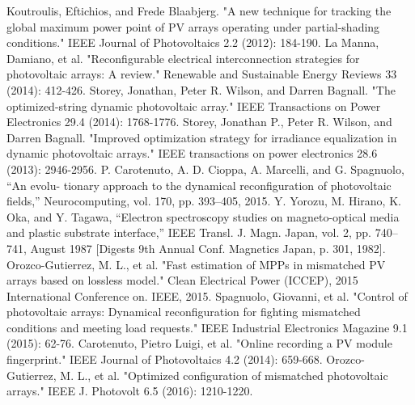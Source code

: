 \documentclass[conference]{IEEEtran}
\begin{document}
\begin{thebibliography}{00}
 Koutroulis, Eftichios, and Frede Blaabjerg. "A new technique for tracking the global maximum power point of PV arrays operating under partial-shading conditions." IEEE Journal of Photovoltaics 2.2 (2012): 184-190.
 La Manna, Damiano, et al. "Reconfigurable electrical interconnection strategies for photovoltaic arrays: A review." Renewable and Sustainable Energy Reviews 33 (2014): 412-426.
Storey, Jonathan, Peter R. Wilson, and Darren Bagnall. "The optimized-string dynamic photovoltaic array." IEEE Transactions on Power Electronics 29.4 (2014): 1768-1776.
 Storey, Jonathan P., Peter R. Wilson, and Darren Bagnall. "Improved optimization strategy for irradiance equalization in dynamic photovoltaic arrays." IEEE transactions on power electronics 28.6 (2013): 2946-2956.
 P. Carotenuto, A. D. Cioppa, A. Marcelli, and G. Spagnuolo, “An evolu- tionary approach to the dynamical reconfiguration of photovoltaic fields,” Neurocomputing, vol. 170, pp. 393–405, 2015.
 Y. Yorozu, M. Hirano, K. Oka, and Y. Tagawa, ``Electron spectroscopy studies on magneto-optical media and plastic substrate interface,'' IEEE Transl. J. Magn. Japan, vol. 2, pp. 740--741, August 1987 [Digests 9th Annual Conf. Magnetics Japan, p. 301, 1982].
 Orozco-Gutierrez, M. L., et al. "Fast estimation of MPPs in mismatched PV arrays based on lossless model." Clean Electrical Power (ICCEP), 2015 International Conference on. IEEE, 2015.
 Spagnuolo, Giovanni, et al. "Control of photovoltaic arrays: Dynamical reconfiguration for fighting mismatched conditions and meeting load requests." IEEE Industrial Electronics Magazine 9.1 (2015): 62-76.
 Carotenuto, Pietro Luigi, et al. "Online recording a PV module fingerprint." IEEE Journal of Photovoltaics 4.2 (2014): 659-668.
 Orozco-Gutierrez, M. L., et al. "Optimized configuration of mismatched photovoltaic arrays." IEEE J. Photovolt 6.5 (2016): 1210-1220.
  
\end{thebibliography}
\end{document}
